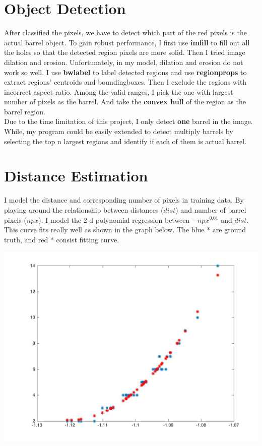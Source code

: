 \documentclass[english]{article}
\begin{document}
\section {Object Detection}
After classified the pixels, we have to detect which part of the red pixels is the actual barrel object. To gain robust performance, I first use \textbf{imfill} to fill out all the holes so that the detected region pixels are more solid. Then I tried image dilation and erosion. Unfortunately, in my model, dilation and erosion do not work so well.  I use \textbf{bwlabel} to label detected regions and use \textbf{regionprops} to extract regions' centroids and boundingboxes. Then I exclude the regions with incorrect aspect ratio. Among the valid ranges, I pick the one with largest number of pixels as the barrel. And take the \textbf{convex hull} of the region as the barrel region. \\
Due to the time limitation of this project, I only detect \textbf{one} barrel in the image. While, my program could be easily extended to detect multiply barrels by selecting the top n largest regions and identify if each of them is actual barrel.\\

\section {Distance Estimation}
I model the distance and corresponding number of pixels in training data. By playing around the relationship between distances ($dist$) and number of barrel pixels ($npx$). I model the 2-d polynomial regression between $ -npx^{0.01} $ and $dist$. This curve fits really well as shown in the graph below. The blue * are ground truth, and red * consist fitting curve.

\begin{center}
\includegraphics[scale=0.25]{distance_plot}
\end{center}
\end{document}
